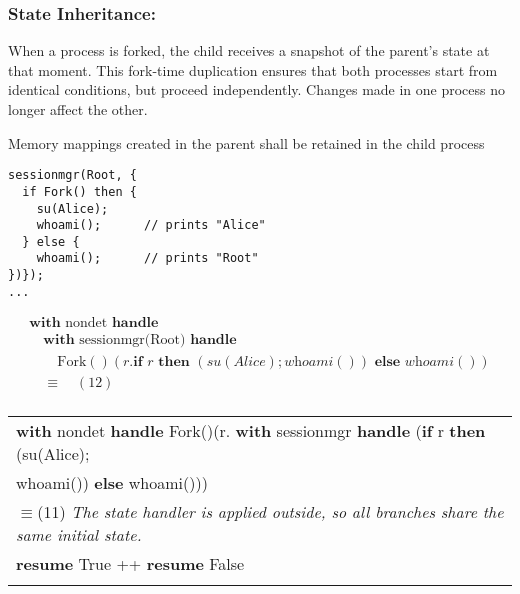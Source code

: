 \documentclass[logo,bsc,singlespacing,parskip]{infthesis}
\begin{document}
    
\subsubsection{State Inheritance:} When a process is forked, the child receives a snapshot of the parent’s state at that moment. This fork-time duplication ensures that both processes start from identical conditions, but proceed independently. Changes made in one process no longer affect the other.

\begin{tcolorbox}[colback=gray!10, colframe=gray!60, sharp corners, boxrule=0.5pt, title={POSIX Base Specifications, Issue 7, p.897}]
Memory mappings created in the parent shall be retained in the child process
\end{tcolorbox}


\begin{tcolorbox}[examplebox, title=Practical Example: Inheriting environment variables]


\begin{lstlisting}
sessionmgr(Root, {
  if Fork() then {
    su(Alice);
    whoami();      // prints "Alice"
  } else {
    whoami();      // prints "Root"
})});
...
\end{lstlisting}
\[
\begin{array}{l}
\textbf{with } \text{nondet} \textbf{ handle } \\
\quad \textbf{with } \text{sessionmgr(Root)} \textbf{ handle } \\
\quad\quad \text{Fork}()(r. \textbf{if } r \textbf{ then } (su(Alice); \textit{whoami}()) \textbf{ else } \textit{whoami}()) \\[5pt]
\quad\equiv\quad (12) \\
\end{array}
\]

\begin{longtable}{@{}l@{}}
\textbf{with } nondet \textbf{ handle } Fork()(r. \textbf{with } sessionmgr \textbf{ handle } (\textbf{if } r \textbf{ then } (su(Alice); \\ whoami()) \textbf{ else } whoami())) \\

\quad$\equiv$\quad (11) \textit{The state handler is applied outside, so all branches share the same initial state.} \\
\textbf{resume } True ++ \textbf{resume } False \\
 \\


\end{longtable}
\end{tcolorbox}
\end{document}
